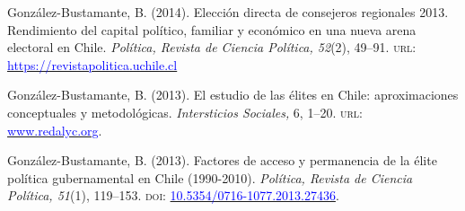 \begin{publications}
\begin{benumerate}{14}

\item{González-Bustamante, B. (2014). Elección directa de consejeros regionales 2013. Rendimiento del capital político, familiar y económico en una nueva arena electoral en Chile. {\itshape Política, Revista de Ciencia Política, 52}(2), 49--91. {\scshape url:} \href{https://revistapolitica.uchile.cl/index.php/RP/article/view/36137}{\textcolor{blue}{https://revistapolitica.uchile.cl}}} \vspace{1mm}


\item{González-Bustamante, B. (2013). El estudio de las élites en Chile: aproximaciones conceptuales y metodológicas. {\itshape Intersticios Sociales,} 6, 1--20. {\scshape url:} \href{https://www.redalyc.org/articulo.oa?id=421739499004}{\textcolor{blue}{www.redalyc.org}}.} \vspace{1mm}


\item{González-Bustamante, B. (2013). Factores de acceso y permanencia de la élite política gubernamental en Chile (1990-2010). {\itshape Política, Revista de Ciencia Política, 51}(1), 119--153. {\scshape doi}: \href{https://doi.org/10.5354/0716-1077.2013.27436}{\textcolor{blue}{10.5354/0716-1077.2013.27436}}.} \vspace{1mm} %


\end{benumerate}
\end{publications}
